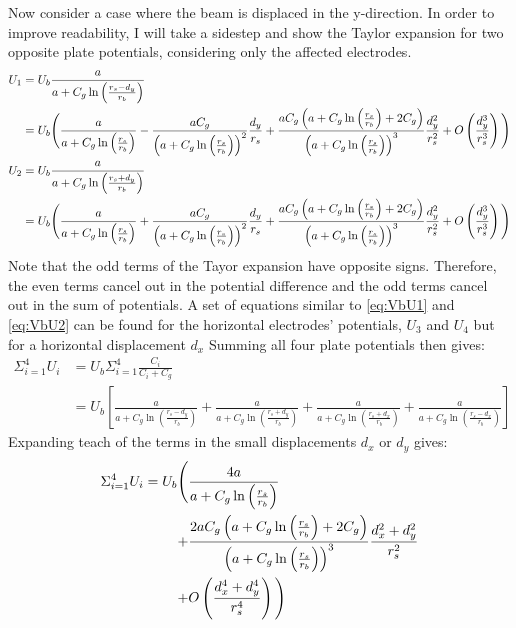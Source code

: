 Now consider a case where the beam is displaced in the y-direction. In order to improve readability, I will take a sidestep and show the Taylor expansion for two opposite plate potentials, considering only the affected electrodes.
\begin{align}
U_1 &= U_b \frac{a}{a+C_g\ln\left(\frac{r_s-d_y}{r_b}\right)} \nonumber \\
&= U_b \Bigg{(} \frac{a}{a+C_g\ln\left(\frac{r_s}{r_b}\right)} %
- \frac{aC_g}{\left( a+C_g \ln\left(\frac{r_s}{r_b}\right) \right)^2}\frac{d_y}{r_s} %
+ \frac{a C_g \left( a + C_g \ln\left( \frac{r_s}{r_b} \right) + 2C_g\right)}{ \left( a+C_g\ln\left(\frac{r_s}{r_b}\right) \right)^3}\frac{d_y^2}{r_s^2} %
+O\left(\frac{d_y^3}{r_s^3}\right) \Bigg{)} \label{eq:VbU1}\\
U_2 &= U_b \frac{a}{a+C_g\ln\left(\frac{r_s+d_y}{r_b}\right)} \nonumber \\
&= U_b \Bigg{(} \frac{a}{a+C_g\ln\left(\frac{r_s}{r_b}\right)} %
+ \frac{aC_g}{\left( a+C_g \ln\left(\frac{r_s}{r_b}\right) \right)^2}\frac{d_y}{r_s} %
+ \frac{a C_g \left( a + C_g \ln\left( \frac{r_s}{r_b} \right) + 2C_g\right)}{ \left( a+C_g\ln\left(\frac{r_s}{r_b}\right) \right)^3}\frac{d_y^2}{r_s^2} %
+O\left(\frac{d_y^3}{r_s^3}\right) \Bigg{)} \label{eq:VbU2}
\end{align}
Note that the odd terms of the Tayor expansion have opposite signs. Therefore, the even terms cancel out in the potential difference and the odd terms cancel out in the sum of potentials. A set of equations similar to \ref{eq:VbU1} and \ref{eq:VbU2} can be found for the horizontal electrodes' potentials, $U_3$ and $U_4$ but for a horizontal displacement $d_x$
Summing all four plate potentials then gives:
\begin{align*}
\Sigma_{i=1}^4 U_i &= U_b \Sigma_{i=1}^4 \frac{C_i}{C_i+C_g} \nonumber\\
&= U_b \left[ \frac{a}{a+C_g\ln\left(\frac{r_s-d_y}{r_b} \right)} + \frac{a}{a+C_g\ln\left(\frac{r_s+d_y}{r_b} \right)} + \frac{a}{a+C_g\ln\left(\frac{r_s+d_x}{r_b} \right)} + \frac{a}{a+C_g\ln\left(\frac{r_s-d_x}{r_b} \right)} \right]
\end{align*}
Expanding teach of the terms in the small displacements $d_x$ or $d_y$ gives:
\begin{align}
\Sigma_{i=1}^4 U_i = U_b \Bigg{(}
&\frac{4a}{a+C_g\ln\left(\frac{r_s}{r_b} \right)} \nonumber \\
+ &\frac{2aC_g\left(a+C_g\ln\left(\frac{r_s}{r_b} \right) +2C_g \right)}{\left(a+C_g\ln\left(\frac{r_s}{r_b} \right)\right)^3} \frac{d_x^2+d_y^2}{r_s^2} \nonumber \\
+ &O\left(\frac{d_x^4+d_y^4}{r_s^4} \right) \Bigg{)}
\label{eq:Vbtotal}
\end{align}
